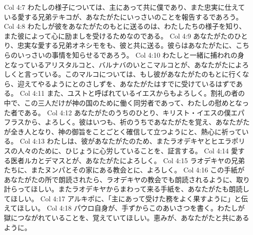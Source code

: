 Col 4:7  わたしの様子については、主にあって共に僕であり、また忠実に仕えている愛する兄弟テキコが、あなたがたにいっさいのことを報告するであろう。
Col 4:8  わたしが彼をあなたがたのもとに送るのは、わたしたちの様子を知り、また彼によって心に励ましを受けるためなのである。
Col 4:9  あなたがたのひとり、忠実な愛する兄弟オネシモをも、彼と共に送る。彼らはあなたがたに、こちらのいっさいの事情を知らせるであろう。
Col 4:10  わたしと一緒に捕われの身となっているアリスタルコと、バルナバのいとこマルコとが、あなたがたによろしくと言っている。このマルコについては、もし彼があなたがたのもとに行くなら、迎えてやるようにとのさしずを、あなたがたはすでに受けているはずである。
Col 4:11  また、ユストと呼ばれているイエスからもよろしく。割礼の者の中で、この三人だけが神の国のために働く同労者であって、わたしの慰めとなった者である。
Col 4:12  あなたがたのうちのひとり、キリスト・イエスの僕エパフラスから、よろしく。彼はいつも、祈のうちであなたがたを覚え、あなたがたが全き人となり、神の御旨をことごとく確信して立つようにと、熱心に祈っている。
Col 4:13  わたしは、彼があなたがたのため、またラオデキヤとヒエラポリスの人々のために、ひじょうに心労していることを、証言する。
Col 4:14  愛する医者ルカとデマスとが、あなたがたによろしく。
Col 4:15  ラオデキヤの兄弟たちに、またヌンパとその家にある教会とに、よろしく。
Col 4:16  この手紙があなたがたの所で朗読されたら、ラオデキヤの教会でも朗読されるように、取り計らってほしい。またラオデキヤからまわって来る手紙を、あなたがたも朗読してほしい。
Col 4:17  アルキポに、「主にあって受けた務をよく果すように」と伝えてほしい。
Col 4:18  パウロ自身が、手ずからこのあいさつを書く。わたしが獄につながれていることを、覚えていてほしい。恵みが、あなたがたと共にあるように。


